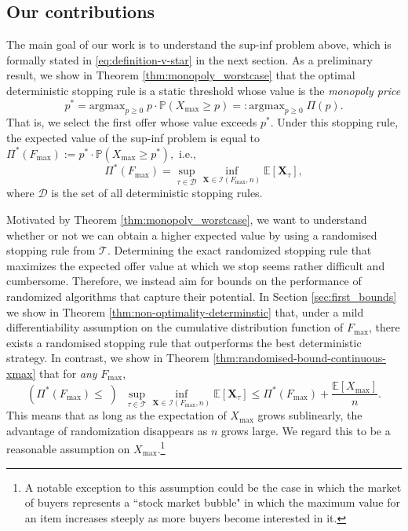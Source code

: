 \documentclass[11pt,a4paper]{article}
\numberwithin{equation}{section}
\begin{document}
\subsection{Our contributions}
The main goal of our work is to understand the sup-inf problem above, which is formally stated in \eqref{eq:definition-v-star} in the next section. As a preliminary result, we show in Theorem \ref{thm:monopoly_worstcase} that the optimal deterministic stopping rule is a static threshold whose value is the \textit{monopoly price} 
$$
p^* = \text{argmax}_{ p \geq 0} \; p \cdot\mathbb{P}(X_{\max}\ge p) =:  \text{argmax}_{ p \geq 0} \; \Pi(p).
$$
That is, we select the first offer whose value exceeds $p^*$. Under this stopping rule, the expected value of the sup-inf problem is equal to 
$
\Pi^*(F_{\max}) :=  p^* \cdot\mathbb{P}(X_{\max}\ge p^*), 
$
i.e.,
$$
\Pi^*(F_{\max}) = \sup_{\tau\in\mathcal{D}} \inf_{\boldsymbol{X}\in\mathcal{I}(F_{\max}, n)} \mathbb{E}[\boldsymbol{X}_{\tau}],
$$
where $\mathcal{D}$ is the set of all deterministic stopping rules.

Motivated by Theorem \ref{thm:monopoly_worstcase}, we want to understand whether or not we can obtain a higher expected value by using a randomised stopping rule from $\mathcal{T}$. {Determining the exact randomized stopping rule that maximizes the expected offer value at which we stop seems rather difficult and cumbersome. Therefore, we instead aim for bounds on the performance of randomized algorithms that capture their potential.} In Section \ref{sec:first_bounds} we show in Theorem \ref{thm:non-optimality-determinstic} that, under a mild differentiability assumption on the cumulative distribution function of $F_{\max}$, there exists a randomised stopping rule that outperforms the best deterministic strategy. In contrast, we show in Theorem \ref{thm:randomised-bound-continuous-xmax} that for \textit{any} $F_{\max}$, 
$$
\left( \Pi^*(F_{\max})  \leq \; \right) \; \; \sup_{\tau\in\mathcal{T}} \inf_{\boldsymbol{X}\in\mathcal{I}(F_{\max}, n)} \mathbb{E}[\boldsymbol{X}_{\tau}] \leq \Pi^*(F_{\max}) + \frac{\mathbb{E}[X_{\max}]}{n}.
$$
This means that as long as the expectation of $X_{\max}$ grows sublinearly, the advantage of randomization disappears as $n$ grows large. We regard this to be a reasonable assumption on $X_{\max}$.\footnote{A notable exception to this assumption could be the case in which the market of buyers represents a ``stock market bubble" in which the maximum value for an item increases steeply as more buyers become interested in it.}
\end{document}
